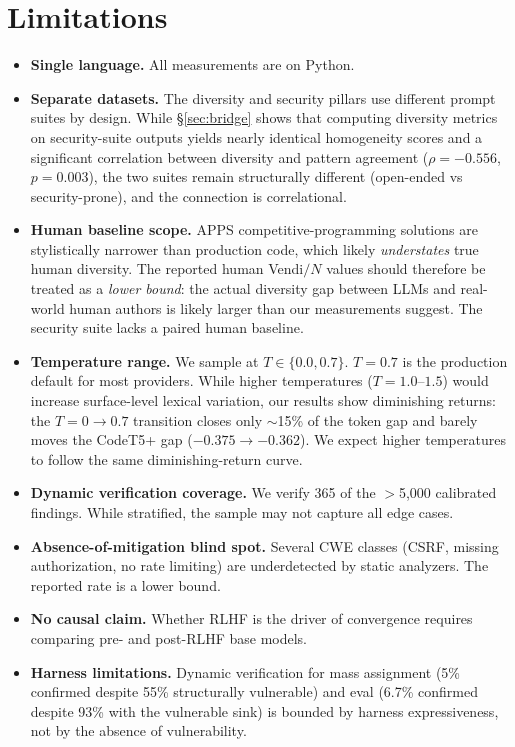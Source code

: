 \documentclass{article}
\begin{document}
\section{Limitations}
\label{sec:limitations}

\begin{itemize}[leftmargin=*]
  \item \textbf{Single language.} All measurements are on Python.
  \item \textbf{Separate datasets.} The diversity and security pillars use
    different prompt suites by design. While \S\ref{sec:bridge} shows that
    computing diversity metrics on security-suite outputs yields nearly
    identical homogeneity scores and a significant correlation between
    diversity and pattern agreement ($\rho = -0.556$, $p = 0.003$), the
    two suites remain structurally different (open-ended vs
    security-prone), and the connection is correlational.
  \item \textbf{Human baseline scope.} APPS competitive-programming
    solutions are stylistically narrower than production code, which likely
    \emph{understates} true human diversity. The reported human Vendi$/N$
    values should therefore be treated as a \emph{lower bound}: the actual
    diversity gap between LLMs and real-world human authors is likely larger
    than our measurements suggest. The security suite lacks a paired human
    baseline.
  \item \textbf{Temperature range.} We sample at $T\in\{0.0,0.7\}$.
    $T{=}0.7$ is the production default for most providers. While higher
    temperatures ($T{=}1.0$--$1.5$) would increase surface-level lexical
    variation, our results show diminishing returns: the $T{=}0\to 0.7$
    transition closes only $\sim$15\% of the token gap and barely moves the
    CodeT5+ gap ($-0.375\to -0.362$). We expect higher temperatures to
    follow the same diminishing-return curve.
  \item \textbf{Dynamic verification coverage.} We verify 365 of the $>$5,000
    calibrated findings. While stratified, the sample may not capture all
    edge cases.
  \item \textbf{Absence-of-mitigation blind spot.} Several CWE classes
    (CSRF, missing authorization, no rate limiting) are underdetected by
    static analyzers. The reported rate is a lower bound.
  \item \textbf{No causal claim.} Whether RLHF is the driver of convergence
    requires comparing pre- and post-RLHF base models.
  \item \textbf{Harness limitations.} Dynamic verification for mass
    assignment (5\% confirmed despite 55\% structurally vulnerable) and
    eval (6.7\% confirmed despite 93\% with the vulnerable sink) is bounded
    by harness expressiveness, not by the absence of vulnerability.
\end{itemize}
\end{document}
